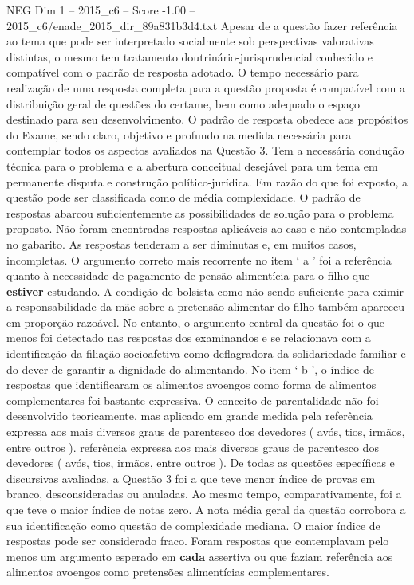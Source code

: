 \begin{textsample}{NEG Dim 1 – 2015\_c6 – Score -1.00 – 2015\_c6/enade\_2015\_dir\_89a831b3d4.txt}
Apesar de a questão fazer referência ao tema que pode ser interpretado socialmente sob perspectivas valorativas distintas, o mesmo tem tratamento doutrinário-jurisprudencial conhecido e compatível com o padrão de resposta adotado.
O tempo necessário para realização de uma resposta completa para a questão proposta é compatível com a distribuição geral de questões do certame, bem como adequado o espaço destinado para seu desenvolvimento.
O padrão de resposta obedece aos propósitos do Exame, sendo claro, objetivo e profundo na medida necessária para contemplar todos os aspectos avaliados na Questão 3.
Tem a necessária condução técnica para o problema e a abertura conceitual desejável para um tema em permanente disputa e construção político-jurídica.
Em razão do que foi exposto, a questão pode ser classificada como de média complexidade.
O padrão de respostas abarcou suficientemente as possibilidades de solução para o problema proposto.
Não foram encontradas respostas aplicáveis ao caso e não contempladas no gabarito.
As respostas tenderam a ser diminutas e, em muitos casos, incompletas.
O argumento correto mais recorrente no item ‘ a ’ foi a referência quanto à necessidade de pagamento de pensão alimentícia para o filho que \textbf{estiver} estudando.
A condição de bolsista como não sendo suficiente para eximir a responsabilidade da mãe sobre a pretensão alimentar do filho também apareceu em proporção razoável.
No entanto, o argumento central da questão foi o que menos foi detectado nas respostas dos examinandos e se relacionava com a identificação da filiação socioafetiva como deflagradora da solidariedade familiar e do dever de garantir a dignidade do alimentando.
No item ‘ b ’, o índice de respostas que identificaram os alimentos avoengos como forma de alimentos complementares foi bastante expressiva.
O conceito de parentalidade não foi desenvolvido teoricamente, mas aplicado em grande medida pela referência expressa aos mais diversos graus de parentesco dos devedores ( avós, tios, irmãos, entre outros ). referência expressa aos mais diversos graus de parentesco dos devedores ( avós, tios, irmãos, entre outros ).
De todas as questões específicas e discursivas avaliadas, a Questão 3 foi a que teve menor índice de provas em branco, desconsideradas ou anuladas.
Ao mesmo tempo, comparativamente, foi a que teve o maior índice de notas zero.
A nota média geral da questão corrobora a sua identificação como questão de complexidade mediana.
O maior índice de respostas pode ser considerado fraco.
Foram respostas que contemplavam pelo menos um argumento esperado em \textbf{cada} assertiva ou que faziam referência aos alimentos avoengos como pretensões alimentícias complementares.

\end{textsample}
